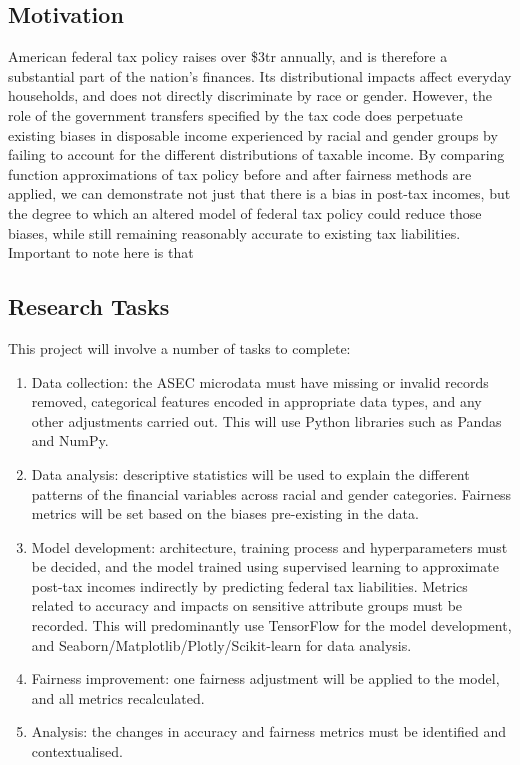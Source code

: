 \documentclass[conference]{IEEEtran}
\begin{document}
\subsection{Motivation}
American federal tax policy raises over \$3tr annually, and is therefore a substantial part of the nation's finances. Its distributional impacts affect everyday households, and does not directly discriminate by race or gender. However, the role of the government transfers specified by the tax code does perpetuate existing biases in disposable income experienced by racial and gender groups by failing to account for the different distributions of taxable income. By comparing function approximations of tax policy before and after fairness methods are applied, we can demonstrate not just that there is a bias in post-tax incomes, but the degree to which an altered model of federal tax policy could reduce those biases, while still remaining reasonably accurate to existing tax liabilities. Important to note here is that 
\subsection{Research Tasks}
This project will involve a number of tasks to complete:
\begin{enumerate}
    \item Data collection: the ASEC microdata must have missing or invalid records removed, categorical features encoded in appropriate data types, and any other adjustments carried out. This will use Python libraries such as Pandas and NumPy.
    \item Data analysis: descriptive statistics will be used to explain the different patterns of the financial variables across racial and gender categories. Fairness metrics will be set based on the biases pre-existing in the data.
    \item Model development: architecture, training process and hyperparameters must be decided, and the model trained using supervised learning to approximate post-tax incomes indirectly by predicting federal tax liabilities. Metrics related to accuracy and impacts on sensitive attribute groups must be recorded. This will predominantly use TensorFlow for the model development, and Seaborn/Matplotlib/Plotly/Scikit-learn for data analysis.
    \item Fairness improvement: one fairness adjustment will be applied to the model, and all metrics recalculated.
    \item Analysis: the changes in accuracy and fairness metrics must be identified and contextualised.
\end{enumerate}
\end{document}
